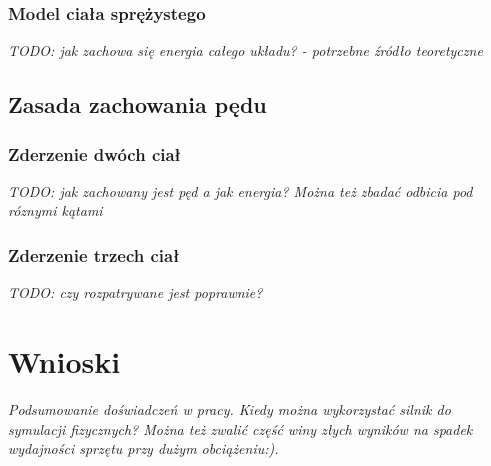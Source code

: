 \subsubsection{Model ciała sprężystego}
\emph{TODO: jak zachowa się energia całego układu? - potrzebne źródło
teoretyczne}


\subsection{Zasada zachowania pędu}

\subsubsection{Zderzenie dwóch ciał}
\emph{TODO: jak zachowany jest pęd a jak energia? Można też zbadać odbicia pod
róznymi kątami}

\subsubsection{Zderzenie trzech ciał}
\emph{TODO: czy rozpatrywane jest poprawnie?}


\newpage
\section{Wnioski}
\emph{Podsumowanie doświadczeń w pracy. Kiedy można wykorzystać silnik do
symulacji fizycznych? Można też zwalić część winy złych wyników na spadek
wydajności sprzętu przy dużym obciążeniu:).}
